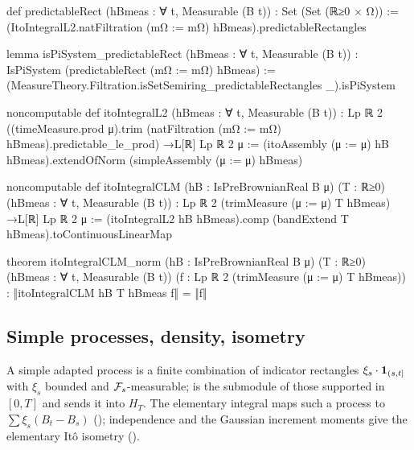 \documentclass[11pt]{article}
\newcommand{\HT}{H_T}
\begin{document}
\begin{leancode}[caption={The predictable rectangles, consumed from \texttt{BrownianMotion} (\texttt{Foundations/ItoIntegralHorizonDense}).},label=lst:rect]
def predictableRect (hBmeas : ∀ t, Measurable (B t)) :
    Set (Set (ℝ≥0 × Ω)) :=
  (ItoIntegralL2.natFiltration (mΩ := mΩ) hBmeas).predictableRectangles

lemma isPiSystem_predictableRect (hBmeas : ∀ t, Measurable (B t)) :
    IsPiSystem (predictableRect (mΩ := mΩ) hBmeas) :=
  (MeasureTheory.Filtration.isSetSemiring_predictableRectangles _).isPiSystem
\end{leancode}

\begin{leancode}[caption={The It\^o integral on the half-line and on a horizon, and its isometry (\texttt{Foundations/ItoIntegralL2Dense}, \texttt{ItoIntegralCLM}).},label=lst:clm]
noncomputable def itoIntegralL2 (hBmeas : ∀ t, Measurable (B t)) :
    Lp ℝ 2 ((timeMeasure.prod μ).trim
      (natFiltration (mΩ := mΩ) hBmeas).predictable_le_prod) →L[ℝ] Lp ℝ 2 μ :=
  (itoAssembly (μ := μ) hB hBmeas).extendOfNorm (simpleAssembly (μ := μ) hBmeas)

noncomputable def itoIntegralCLM (hB : IsPreBrownianReal B μ) (T : ℝ≥0)
    (hBmeas : ∀ t, Measurable (B t)) :
    Lp ℝ 2 (trimMeasure (μ := μ) T hBmeas) →L[ℝ] Lp ℝ 2 μ :=
  (itoIntegralL2 hB hBmeas).comp (bandExtend T hBmeas).toContinuousLinearMap

theorem itoIntegralCLM_norm (hB : IsPreBrownianReal B μ) (T : ℝ≥0)
    (hBmeas : ∀ t, Measurable (B t))
    (f : Lp ℝ 2 (trimMeasure (μ := μ) T hBmeas)) :
    ‖itoIntegralCLM hB T hBmeas f‖ = ‖f‖
\end{leancode}

\subsection{Simple processes, density, isometry}
A simple adapted process is a finite combination of indicator rectangles $\xi_s\cdot\mathbf{1}_{(s,t]}$ with
$\xi_s$ bounded and $\mathcal{F}_s$-measurable;  is the submodule of those supported in $[0,T]$ and
 sends it into $\HT$. The elementary integral maps such a process to
$\sum\xi_s(B_t-B_s)$ (); independence and the Gaussian increment moments give the
elementary It\^o isometry ().
\end{document}
